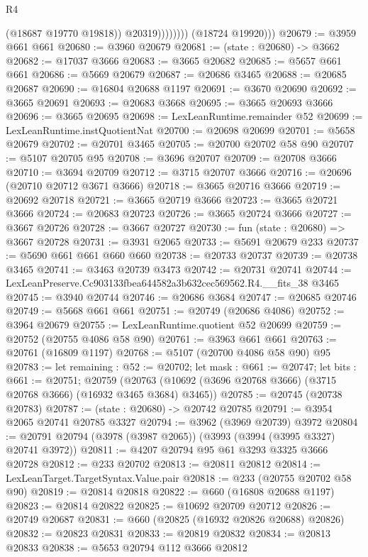 \begin{lexlean}{R4}
\begin{coremodule}
                          (@18687 @19770 @19818))
                        @20319))))))))
        (@18724 @19920)))
@20679 := @3959 @661 @661
@20680 := @3960 @20679
@20681 := (state : @20680) -> @3662
@20682 := @17037 @3666
@20683 := @3665 @20682
@20685 := @5657 @661 @661
@20686 := @5669 @20679
@20687 := @20686 @3465
@20688 := @20685 @20687
@20690 := @16804 @20688 @1197
@20691 := @3670 @20690
@20692 := @3665 @20691
@20693 := @20683 @3668
@20695 := @3665 @20693 @3666
@20696 := @3665 @20695
@20698 := LexLeanRuntime.remainder @52
@20699 := LexLeanRuntime.instQuotientNat
@20700 := @20698 @20699
@20701 := @5658 @20679
@20702 := @20701 @3465
@20705 := @20700 @20702 @58 @90
@20707 := @5107 @20705 @95
@20708 := @3696 @20707
@20709 := @20708 @3666
@20710 := @3694 @20709
@20712 := @3715 @20707 @3666
@20716 := @20696 (@20710 @20712 @3671 @3666)
@20718 := @3665 @20716 @3666
@20719 := @20692 @20718
@20721 := @3665 @20719 @3666
@20723 := @3665 @20721 @3666
@20724 := @20683 @20723
@20726 := @3665 @20724 @3666
@20727 := @3667 @20726
@20728 := @3667 @20727
@20730 := fun (state : @20680) => @3667 @20728
@20731 := @3931 @2065
@20733 := @5691 @20679 @233
@20737 := @5690 @661 @661 @660 @660
@20738 := @20733 @20737
@20739 := @20738 @3465
@20741 := @3463 @20739 @3473
@20742 := @20731 @20741
@20744 := LexLeanPreserve.Cc903133fbea644582a3b632cec569562.R4.__fits_38 @3465
@20745 := @3940 @20744
@20746 := @20686 @3684
@20747 := @20685 @20746
@20749 := @5668 @661 @661
@20751 := @20749 (@20686 @4086)
@20752 := @3964 @20679
@20755 := LexLeanRuntime.quotient @52 @20699
@20759 := @20752 (@20755 @4086 @58 @90)
@20761 := @3963 @661 @661
@20763 := @20761 (@16809 @1197)
@20768 := @5107 (@20700 @4086 @58 @90) @95
@20783 := let remaining : @52 := @20702;
  let mask : @661 := @20747;
  let bits : @661 := @20751;
  @20759 (@20763 (@10692 (@3696 @20768 @3666) (@3715 @20768 @3666) (@16932 @3465 @3684) @3465))
@20785 := @20745 (@20738 @20783)
@20787 := (state : @20680) -> @20742 @20785
@20791 := @3954 @2065 @20741 @20785 @3327
@20794 := @3962 (@3969 @20739) @3972
@20804 := @20791 @20794 (@3978 (@3987 @2065)) (@3993 (@3994 (@3995 @3327) @20741 @3972))
@20811 := @4207 @20794 @95 @61 @3293 @3325 @3666 @20728
@20812 := @233 @20702
@20813 := @20811 @20812
@20814 := LexLeanTarget.TargetSyntax.Value.pair
@20818 := @233 (@20755 @20702 @58 @90)
@20819 := @20814 @20818
@20822 := @660 (@16808 @20688 @1197)
@20823 := @20814 @20822
@20825 := @10692 @20709 @20712
@20826 := @20749 @20687
@20831 := @660 (@20825 (@16932 @20826 @20688) @20826)
@20832 := @20823 @20831
@20833 := @20819 @20832
@20834 := @20813 @20833
@20838 := @5653 @20794 @112 @3666 @20812

\end{coremodule}
\end{lexlean}

